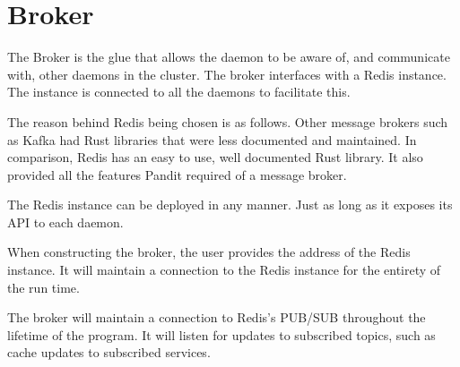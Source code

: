 \documentclass[a4paper,12pt]{report}
\begin{document}
\section{Broker}
\label{sec:broker}

The Broker is the glue that allows the daemon to be aware of, and communicate with, other daemons in the cluster.
The broker interfaces with a Redis \cite{redis} instance. The instance is connected to all the daemons to facilitate this.

The reason behind Redis being chosen is as follows. Other message brokers \cite{broker} such as Kafka had Rust libraries that were less documented and maintained. 
In comparison, Redis has an easy to use, well documented Rust library. It also provided all the features Pandit required of a message broker.

The Redis instance can be deployed in any manner. Just as long as it exposes its API to each daemon.

When constructing the broker, the user provides the address of the Redis instance. It will maintain a connection to the Redis instance for the entirety of the run time.

The broker will maintain a connection to Redis's PUB/SUB \cite{pubsub} throughout the lifetime of the program. It will listen for updates to subscribed topics, such as cache updates to subscribed services.
\end{document}
